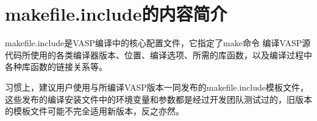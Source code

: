 \section{\rm{makefile.include}的内容简介}
\textrm{makefile.include}是\textrm{VASP}编译中的核心配置文件，它指定了\textrm{make}命令%
编译\textrm{VASP}源代码所使用的各类编译器版本、位置、编译选项、所需的库函数，以及编译过程中各种库函数的链接关系等。%

习惯上，建议用户使用与所编译\textrm{VASP}版本一同发布的makefile.include模板文件，这些发布的编译安装文件中的环境变量和参数都是经过开发团队测试过的，旧版本的模板文件可能不完全适用新版本，反之亦然。%
%

